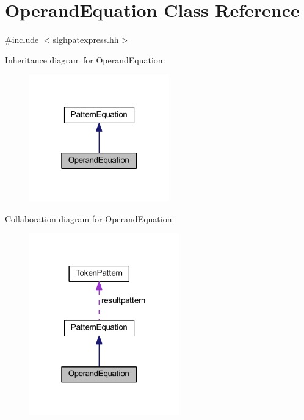 \hypertarget{class_operand_equation}{}\section{Operand\+Equation Class Reference}
\label{class_operand_equation}


{\ttfamily \#include $<$slghpatexpress.\+hh$>$}



Inheritance diagram for Operand\+Equation\+:
\nopagebreak
\begin{figure}[H]
\begin{center}
\leavevmode
\includegraphics[width=172pt]{class_operand_equation__inherit__graph}
\end{center}
\end{figure}


Collaboration diagram for Operand\+Equation\+:
\nopagebreak
\begin{figure}[H]
\begin{center}
\leavevmode
\includegraphics[width=184pt]{class_operand_equation__coll__graph}
\end{center}
\end{figure}
